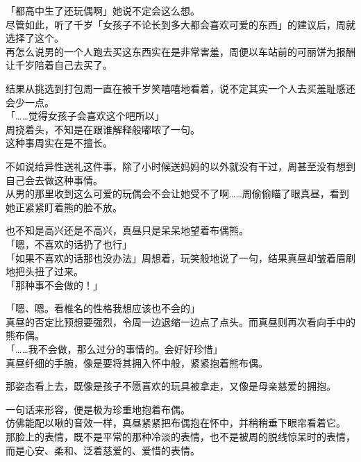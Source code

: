 「都高中生了还玩偶啊」她说不定会这么想。\\

尽管如此，听了千岁「女孩子不论长到多大都会喜欢可爱的东西」的建议后，周就选择了这个。\\

再怎么说男的一个人跑去买这东西实在是非常害羞，周便以车站前的可丽饼为报酬让千岁陪着自己去买了。

结果从挑选到打包周一直在被千岁笑嘻嘻地看着，说不定其实一个人去买羞耻感还会少一点。\\

「……觉得女孩子会喜欢这个吧所以」\\

周挠着头，不知是在跟谁解释般嘟哝了一句。\\

这种事周实在是不擅长。

不如说给异性送礼这件事，除了小时候送妈妈的以外就没有干过，周甚至没有想到自己会去做这种事情。\\

从男的那里收到这么可爱的玩偶会不会让她受不了啊……周偷偷瞄了眼真昼，看到她正紧紧盯着熊的脸不放。

也不知是高兴还是不高兴，真昼只是呆呆地望着布偶熊。\\

「嗯，不喜欢的话扔了也行」\\

「如果不喜欢的话那也没办法」周想着，玩笑般地说了一句，结果真昼却皱着眉刷地把头扭了过来。\\

「那种事不会做的！」

「嗯、嗯。看椎名的性格我想应该也不会的」\\

真昼的否定比预想要强烈，令周一边退缩一边点了点头。而真昼则再次看向手中的熊布偶。\\

「……我不会做，那么过分的事情的。会好好珍惜」\\

真昼纤细的手腕，像是要将其拥入怀中般，紧紧抱着熊布偶。

那姿态看上去，既像是孩子不愿喜欢的玩具被拿走，又像是母亲慈爱的拥抱。

一句话来形容，便是极为珍重地抱着布偶。\\

仿佛能配以啾的音效一样，真昼紧紧把布偶抱在怀中，并稍稍垂下眼帘看着它。\\

那脸上的表情，既不是平常的那种冷淡的表情，也不是被周的脱线惊呆时的表情，而是心安、柔和、泛着慈爱的、爱惜的表情。

